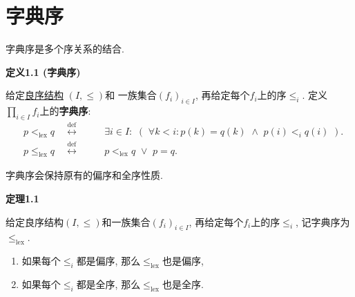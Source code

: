 \documentclass[UTF8]{ctexart}
\begin{document}
\setlength{\abovedisplayskip}{1pt}
\setlength{\belowdisplayskip}{1pt}

\section{字典序}

字典序是多个序关系的结合.

\vspace{10pt}

\hypertarget{sec:定义1.1}{}
\noindent\textbf{定义1.1 (字典序)}

给定\href{04 良序关系#nameddest=sec:定义1.1}{良序结构} $(I,\leqslant)$和
一族集合$(f_i)_{i\in I}$, 再给定每个$f_i$上的序$\leqslant_i$.
定义$\displaystyle\prod_{i\in I}f_i$上的\textbf{字典序}:
\[\begin{aligned}
    &p<_{\mathrm{lex}}q\quad\overset{\mathrm{def}}{\leftrightarrow}\quad&&
    \exists i\in I:\,\,(\,\,\forall k<i:p(k)=q(k)\,\,\land\,\,p(i)<_iq(i)\,\,).
    \\[-3pt]
    &p\leqslant_{\mathrm{lex}}q\quad\overset{\mathrm{def}}{\leftrightarrow}\quad
    &&p<_{\mathrm{lex}}q\,\,\lor\,\,p=q.
\end{aligned}\]

\vspace{10pt}

字典序会保持原有的偏序和全序性质.

\vspace{10pt}

\hypertarget{sec:定理1.1}{}
\noindent\textbf{定理1.1}

给定良序结构$(I,\leqslant)$和一族集合$(f_i)_{i\in I}$,
再给定每个$f_i$上的序$\leqslant_i$, 记字典序为$\leqslant_{\mathrm{lex}}$.

\begin{enumerate}
    \item 如果每个$\leqslant_i$都是偏序, 那么$\leqslant_{\mathrm{lex}}$也是偏序,
    \item 如果每个$\leqslant_i$都是全序, 那么$\leqslant_{\mathrm{lex}}$也是全序.
\end{enumerate}

\end{document}
